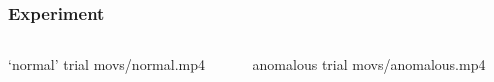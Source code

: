 \documentclass{beamer}
\begin{document}
    \begin{frame}
    	\frametitle{Experiment}
    	\begin{columns}[onlytextwidth]
            \begin{column}{.5\textwidth}
                \begin{block}{`normal' trial}
                    \vspace{.5\baselineskip}
                    {movs/normal.mp4}
                \end{block}
            \end{column}
            \begin{column}{.5\textwidth}
                \begin{block}{anomalous trial}
                    \vspace{.5\baselineskip}
                    {movs/anomalous.mp4}
                \end{block}
            \end{column}
        \end{columns}
    \end{frame}
\end{document}
